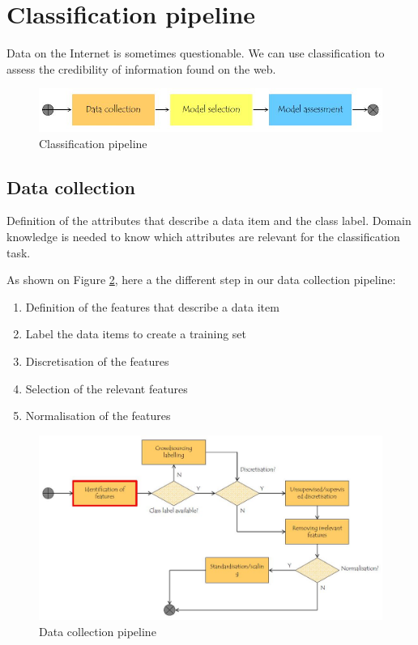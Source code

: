 \section{Classification pipeline}
Data on the Internet is sometimes questionable. We can use classification to assess the credibility of information found on the web.

\begin{figure}[!ht]
  \centering
  \includegraphics[width=1.0\linewidth]{figures/classification_pipeline}
  \caption{Classification pipeline}
  \label{fig:classificationPipeline}
\end{figure}

\subsection*{Data collection}
Definition of the attributes that describe a data item and the class label. Domain knowledge is needed to know which attributes are relevant for the classification task.

As shown on Figure \ref{fig:dataCollection}, here a the different step in our data collection pipeline:
\begin{enumerate}
	\item Definition of the features that describe a data item
	\item Label the data items to create a training set
	\item Discretisation of the features
	\item Selection of the relevant features
	\item Normalisation of the features
\end{enumerate}

\begin{figure}[!ht]
  \centering
  \includegraphics[width=1.0\linewidth]{figures/data_collection}
  \caption{Data collection pipeline}
  \label{fig:dataCollection}
\end{figure}

